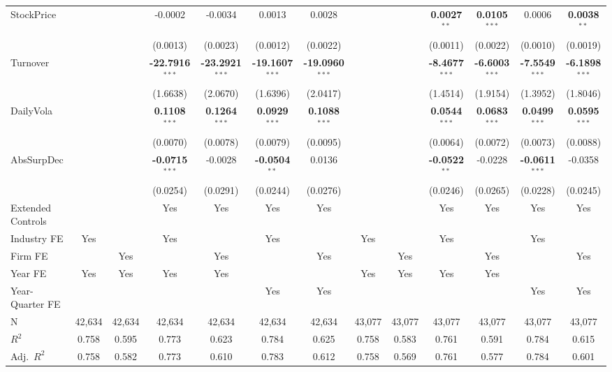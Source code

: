 \documentclass[11pt,a4paper]{article}
\begin{document}
\begin{table}[htbp]
\begin{tabular}{lcccccccccccc}
StockPrice &  &  & -0.0002 & -0.0034 & 0.0013 & 0.0028 &  &  & \textbf{0.0027}$^{**}$ & \textbf{0.0105}$^{***}$ & 0.0006 & \textbf{0.0038}$^{**}$ \\
 &  &  & (0.0013) & (0.0023) & (0.0012) & (0.0022) &  &  & (0.0011) & (0.0022) & (0.0010) & (0.0019) \\
Turnover &  &  & \textbf{-22.7916}$^{***}$ & \textbf{-23.2921}$^{***}$ & \textbf{-19.1607}$^{***}$ & \textbf{-19.0960}$^{***}$ &  &  & \textbf{-8.4677}$^{***}$ & \textbf{-6.6003}$^{***}$ & \textbf{-7.5549}$^{***}$ & \textbf{-6.1898}$^{***}$ \\
 &  &  & (1.6638) & (2.0670) & (1.6396) & (2.0417) &  &  & (1.4514) & (1.9154) & (1.3952) & (1.8046) \\
DailyVola &  &  & \textbf{0.1108}$^{***}$ & \textbf{0.1264}$^{***}$ & \textbf{0.0929}$^{***}$ & \textbf{0.1088}$^{***}$ &  &  & \textbf{0.0544}$^{***}$ & \textbf{0.0683}$^{***}$ & \textbf{0.0499}$^{***}$ & \textbf{0.0595}$^{***}$ \\
 &  &  & (0.0070) & (0.0078) & (0.0079) & (0.0095) &  &  & (0.0064) & (0.0072) & (0.0073) & (0.0088) \\
AbsSurpDec &  &  & \textbf{-0.0715}$^{***}$ & -0.0028 & \textbf{-0.0504}$^{**}$ & 0.0136 &  &  & \textbf{-0.0522}$^{**}$ & -0.0228 & \textbf{-0.0611}$^{***}$ & -0.0358 \\
 &  &  & (0.0254) & (0.0291) & (0.0244) & (0.0276) &  &  & (0.0246) & (0.0265) & (0.0228) & (0.0245) \\
\midrule
Extended Controls &  &  & Yes & Yes & Yes & Yes &  &  & Yes & Yes & Yes & Yes \\
Industry FE & Yes &  & Yes &  & Yes &  & Yes &  & Yes &  & Yes &  \\
Firm FE &  & Yes &  & Yes &  & Yes &  & Yes &  & Yes &  & Yes \\
Year FE & Yes & Yes & Yes & Yes &  &  & Yes & Yes & Yes & Yes &  &  \\
Year-Quarter FE &  &  &  &  & Yes & Yes &  &  &  &  & Yes & Yes \\
\midrule
N & 42,634 & 42,634 & 42,634 & 42,634 & 42,634 & 42,634 & 43,077 & 43,077 & 43,077 & 43,077 & 43,077 & 43,077 \\
$R^2$ & 0.758 & 0.595 & 0.773 & 0.623 & 0.784 & 0.625 & 0.758 & 0.583 & 0.761 & 0.591 & 0.784 & 0.615 \\
Adj.~$R^2$ & 0.758 & 0.582 & 0.773 & 0.610 & 0.783 & 0.612 & 0.758 & 0.569 & 0.761 & 0.577 & 0.784 & 0.601 \\
\bottomrule
\end{tabular}

\end{table}
\end{document}
